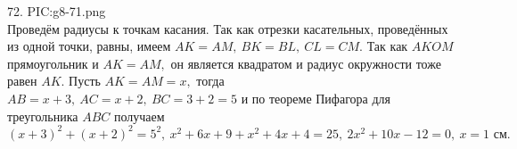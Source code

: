 72. {{PIC:g8-71.png}}\\
Проведём радиусы к точкам касания. Так как отрезки касательных, проведённых из одной точки, равны, имеем $AK=AM,\ BK=BL,\ CL=CM.$ Так как $AKOM$ прямоугольник и $AK=AM,$ он является квадратом и радиус окружности тоже равен $AK.$ Пусть $AK=AM=x,$ тогда $AB=x+3,\ AC=x+2,\ BC=3+2=5$ и по теореме Пифагора для треугольника $ABC$ получаем $(x+3)^2+(x+2)^2=5^2,\ x^2+6x+9+x^2+4x+4=25,\ 2x^2+10x-12=0,\ x=1\text{ см}.$\\
